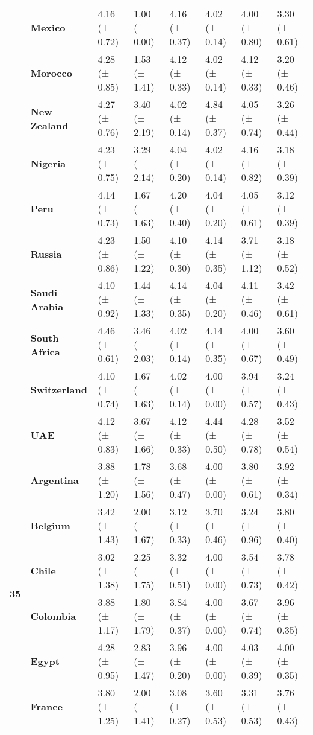 \begin{longtable}{llllllll}
\textbf{} & \textbf{Mexico} & 4.16 (± 0.72) & 1.00 (± 0.00) & 4.16 (± 0.37) & 4.02 (± 0.14) & 4.00 (± 0.80) & 3.30 (± 0.61) \\
\textbf{} & \textbf{Morocco} & 4.28 (± 0.85) & 1.53 (± 1.41) & 4.12 (± 0.33) & 4.02 (± 0.14) & 4.12 (± 0.33) & 3.20 (± 0.46) \\
\textbf{} & \textbf{New Zealand} & 4.27 (± 0.76) & 3.40 (± 2.19) & 4.02 (± 0.14) & 4.84 (± 0.37) & 4.05 (± 0.74) & 3.26 (± 0.44) \\
\textbf{} & \textbf{Nigeria} & 4.23 (± 0.75) & 3.29 (± 2.14) & 4.04 (± 0.20) & 4.02 (± 0.14) & 4.16 (± 0.82) & 3.18 (± 0.39) \\
\textbf{} & \textbf{Peru} & 4.14 (± 0.73) & 1.67 (± 1.63) & 4.20 (± 0.40) & 4.04 (± 0.20) & 4.05 (± 0.61) & 3.12 (± 0.39) \\
\textbf{} & \textbf{Russia} & 4.23 (± 0.86) & 1.50 (± 1.22) & 4.10 (± 0.30) & 4.14 (± 0.35) & 3.71 (± 1.12) & 3.18 (± 0.52) \\
\textbf{} & \textbf{Saudi Arabia} & 4.10 (± 0.92) & 1.44 (± 1.33) & 4.14 (± 0.35) & 4.04 (± 0.20) & 4.11 (± 0.46) & 3.42 (± 0.61) \\
\textbf{} & \textbf{South Africa} & 4.46 (± 0.61) & 3.46 (± 2.03) & 4.02 (± 0.14) & 4.14 (± 0.35) & 4.00 (± 0.67) & 3.60 (± 0.49) \\
\textbf{} & \textbf{Switzerland} & 4.10 (± 0.74) & 1.67 (± 1.63) & 4.02 (± 0.14) & 4.00 (± 0.00) & 3.94 (± 0.57) & 3.24 (± 0.43) \\
\textbf{} & \textbf{UAE} & 4.12 (± 0.83) & 3.67 (± 1.66) & 4.12 (± 0.33) & 4.44 (± 0.50) & 4.28 (± 0.78) & 3.52 (± 0.54) \\
\cline{1-8}
\multirow[t]{19}{*}{\textbf{35}} & \textbf{Argentina} & 3.88 (± 1.20) & 1.78 (± 1.56) & 3.68 (± 0.47) & 4.00 (± 0.00) & 3.80 (± 0.61) & 3.92 (± 0.34) \\
\textbf{} & \textbf{Belgium} & 3.42 (± 1.43) & 2.00 (± 1.67) & 3.12 (± 0.33) & 3.70 (± 0.46) & 3.24 (± 0.96) & 3.80 (± 0.40) \\
\textbf{} & \textbf{Chile} & 3.02 (± 1.38) & 2.25 (± 1.75) & 3.32 (± 0.51) & 4.00 (± 0.00) & 3.54 (± 0.73) & 3.78 (± 0.42) \\
\textbf{} & \textbf{Colombia} & 3.88 (± 1.17) & 1.80 (± 1.79) & 3.84 (± 0.37) & 4.00 (± 0.00) & 3.67 (± 0.74) & 3.96 (± 0.35) \\
\textbf{} & \textbf{Egypt} & 4.28 (± 0.95) & 2.83 (± 1.47) & 3.96 (± 0.20) & 4.00 (± 0.00) & 4.03 (± 0.39) & 4.00 (± 0.35) \\
\textbf{} & \textbf{France} & 3.80 (± 1.25) & 2.00 (± 1.41) & 3.08 (± 0.27) & 3.60 (± 0.53) & 3.31 (± 0.53) & 3.76 (± 0.43) \\

\end{longtable}

